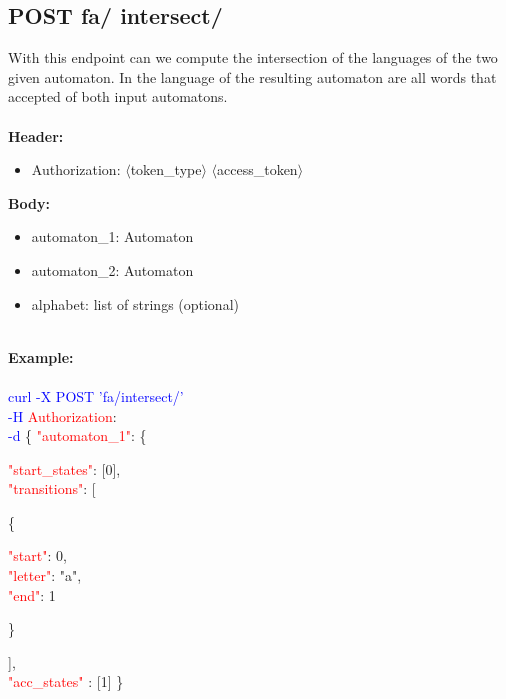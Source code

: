 \subsection{POST fa/ intersect/}
With this endpoint can we compute the intersection of the languages of the two given automaton. In the language of the resulting automaton are all words that accepted of both input automatons.\\
\ \\
\textbf{Header:}
\begin{itemize}
    \item Authorization: $\langle$token\_type$\rangle$ $\langle$access\_token$\rangle$
\end{itemize}
\textbf{Body:}
\ \\
\begin{itemize}
    \item automaton\_1: Automaton
     \item automaton\_2: Automaton
    \item alphabet: list of strings (optional)
\end{itemize}
\ \\
\textbf{Example:} \\
\ \\
\textcolor{blue}{curl -X POST '\BaseURL fa/intersect/'\\
-H} \textcolor{red}{Authorization}: \Auth \\
\textcolor{blue}{-d} \{ 
     \textcolor{red}{"automaton\_1"}: \{
     \begin{adjustwidth}{7.5 mm}{0 cm}
     \begin{adjustwidth}{7.5 mm}{0 cm}
            \textcolor{red}{"start\_states"}: [0],\\
            \textcolor{red}{"transitions"}: [
            \begin{adjustwidth}{7.5 mm}{0 cm}
            \{
               \begin{adjustwidth}{7.5 mm}{0 cm}
                    \textcolor{red}{"start"}: 0,\\
                    \textcolor{red}{"letter"}: "a",\\
                    \textcolor{red}{"end"}: 1
               \end{adjustwidth}
            \}
            \end{adjustwidth}
            ],\\
        \textcolor{red}{"acc\_states" }: [1]  \}
    \end{adjustwidth}
    \end{adjustwidth}
